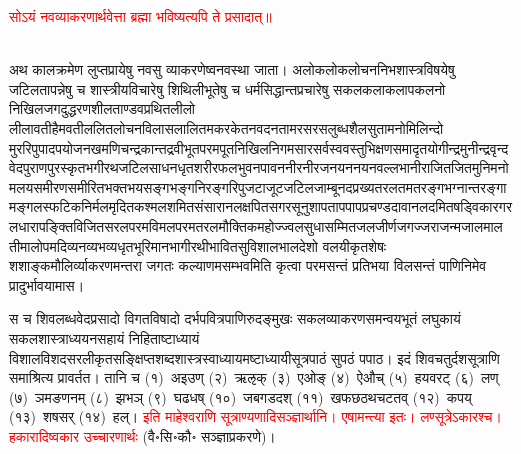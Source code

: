 \centering\textcolor{red}{सोऽयं नवव्याकरणार्थवेत्ता ब्रह्मा भविष्यत्यपि ते प्रसादात्॥}\nopagebreak\\
\\
\begin{sloppypar}\justifying\noindent अथ काल\-क्रमेण लुप्त\-प्रायेषु नवसु व्याकरणेष्वनवस्था जाता। अलोक\-लोक\-लोचन\-निभ\-शास्त्र\-विषयेषु जटिलतापन्नेषु च शास्त्रीय\-विचारेषु शिथिली\-भूतेषु च धर्म\-सिद्धान्त\-प्रचारेषु सकल\-कला\-कलाप\-कलनो निखिल\-जगदुद्धरण\-शील\-ताण्डव\-प्रथित\-लीलो लीलावती\-हैमवती\-ललित\-लोचन\-विलास\-लालित\-मकर\-केतन\-वदन\-तामरस\-रस\-लुब्ध\-शैल\-सुता\-मनोमिलिन्दो मुररिपु\-पाद\-पयोज\-नख\-मणि\-चन्द्र\-कान्त\-द्रवीभूत\-परम\-पूत\-निखिल\-निगम\-सार\-सर्वस्व\-वस्तु\-भिक्षण\-समादृत\-योगीन्द्र\-मुनीन्द्र\-वृन्द\-वेद\-पुराण\-पुरस्कृत\-भगीरथ\-जटिल\-साधन\-धृत\-शरीर\-फल\-भुवन\-पावन\-नीर\-नीरज\-नयन\-नयन\-वल्लभा\-नीराजित\-जित\-मुनि\-मनो\-मलय\-समीरण\-समीरित\-भक्त\-भय\-सङ्ग\-भङ्ग\-निरङ्ग\-रिपु\-जटा\-जूट\-जटिल\-जाम्बूनद\-प्रख्य\-तरलतम\-तरङ्ग\-भग्नान्तरङ्गामङ्गल\-स्फटिक\-निर्मल\-मृदित\-कश्मल\-शमित\-संसारानल\-क्षपित\-सगर\-सूनु\-शाप\-ताप\-पाप\-प्रचण्ड\-दावानल\-दमित\-षड्विकार\-गरल\-धारा\-पङ्क्ति\-विजित\-सरल\-परम\-विमल\-परम\-तरल\-मौक्तिक\-महोज्ज्वल\-सुधा\-सम्मित\-जल\-जीर्ण\-जगज्जरा\-जन्म\-जाल\-मालती\-मालोपम\-दिव्य\-नव्य\-भव्य\-धृत\-भूरिमान\-भागीरथी\-भावित\-सुविशाल\-भालदेशो वलयीकृत\-शेषः शशाङ्क\-मौलिर्व्याकरण\-मन्तरा जगतः कल्याणमसम्भवमिति कृत्वा परम\-सन्तं प्रतिभया विलसन्तं पाणिनिमेव प्रादुर्भावयामास।\end{sloppypar}
\begin{sloppypar}\justifying\noindent\hspace{10mm} स च शिव\-लब्ध\-वेद\-प्रसादो विगत\-विषादो दर्भ\-पवित्र\-पाणिरुदङ्मुखः सकल\-व्याकरण\-समन्वय\-भूतं लघु\-कायं सकल\-शास्त्राध्ययन\-सहायं निहिताष्टाध्यायं विशाल\-विशद\-सरलीकृत\-सङ्क्षिप्त\-शब्द\-शास्त्र\-स्वाध्यायमष्टाध्यायी\-सूत्र\-पाठं सुपठं पपाठ। इदं शिव\-चतुर्दश\-सूत्राणि समाश्रित्य प्रावर्तत। तानि च (१)~अइउण् (२)~ऋऌक् (३)~एओङ् (४)~ऐऔच् (५)~हयवरट् (६)~लण् (७)~ञमङणनम् (८)~झभञ् (९)~घढधष् (१०)~जबगडदश् (११)~खफछठथचटतव् (१२)~कपय् (१३)~शषसर् (१४)~हल्। \textcolor{red}{इति माहेश्वराणि सूत्राण्यणादिसञ्ज्ञार्थानि। एषामन्त्या इतः। लण्सूत्रेऽकारश्च। हकारादिष्वकार उच्चारणार्थः} (वै॰सि॰कौ॰ सञ्ज्ञाप्रकरणे)।\end{sloppypar}
